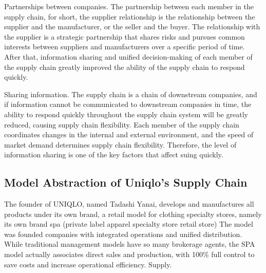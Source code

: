 \documentclass[]{article}
\begin{document}
Partnerships between companies. The partnership between each member in
the supply chain, for short, the supplier relationship is the
relationship between the supplier and the manufacturer, or the seller
and the buyer. The relationship with the supplier is a strategic
partnership that shares risks and pursues common interests between
suppliers and manufacturers over a specific period of time. After that,
information sharing and unified decision-making of each member of the
supply chain greatly improved the ability of the supply chain to respond
quickly.

Sharing information. The supply chain is a chain of downstream
companies, and if information cannot be communicated to downstream
companies in time, the ability to respond quickly throughout the supply
chain system will be greatly reduced, causing supply chain flexibility.
Each member of the supply chain coordinates changes in the internal and
external environment, and the speed of market demand determines supply
chain flexibility. Therefore, the level of information sharing is one of
the key factors that affect suing quickly.

\hypertarget{model-abstraction-of-uniqlos-supply-chain}{%
\subsection{Model Abstraction of Uniqlo's Supply
Chain}\label{model-abstraction-of-uniqlos-supply-chain}}

The founder of UNIQLO, named Tadashi Yanai, develops and manufactures
all products under its own brand, a retail model for clothing specialty
stores, namely its own brand spa (private label apparel specialty store
retail store) The model was founded companies with integrated operations
and unified distribution. While traditional management models have so
many brokerage agents, the SPA model actually associates direct sales
and production, with 100\% full control to save costs and increase
operational efficiency. Supply.
\end{document}
